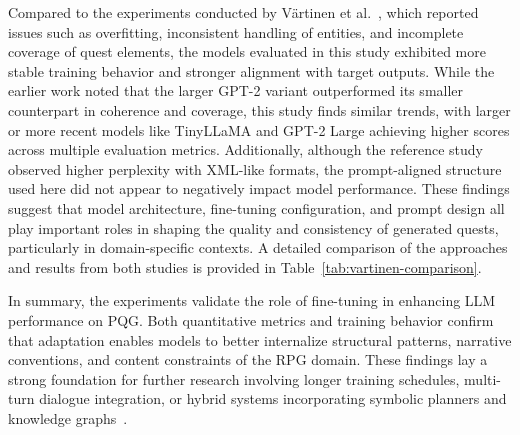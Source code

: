 Compared to the experiments conducted by V{\"a}rtinen et al.~\cite{vartinen2022generating}, which reported issues
such as overfitting, inconsistent handling of entities, and incomplete coverage of
quest elements, the models evaluated in this study exhibited more stable training behavior
and stronger alignment with target outputs. While the earlier work noted that the
larger GPT-2 variant outperformed its smaller counterpart in coherence and coverage, this
study finds similar trends, with larger or more recent models like TinyLLaMA and GPT-2 Large
achieving higher scores across multiple evaluation metrics. Additionally, although
the reference study observed higher perplexity with XML-like formats, the prompt-aligned
structure used here did not appear to negatively impact model performance. These findings
suggest that model architecture, fine-tuning configuration, and prompt design all play
important roles in shaping the quality and consistency of generated quests, particularly
in domain-specific contexts. A detailed comparison of the approaches and results from
both studies is provided in Table~\ref{tab:vartinen-comparison}.

In summary, the experiments validate the role of fine-tuning in enhancing LLM performance
on PQG. Both quantitative metrics and training behavior confirm that adaptation
enables models to better internalize structural patterns, narrative conventions,
and content constraints of the RPG domain. These findings lay a strong foundation for further
research involving longer training schedules, multi-turn dialogue integration, or hybrid
systems incorporating symbolic planners and knowledge graphs~\cite{ashby2023personalized}.

\newpage
